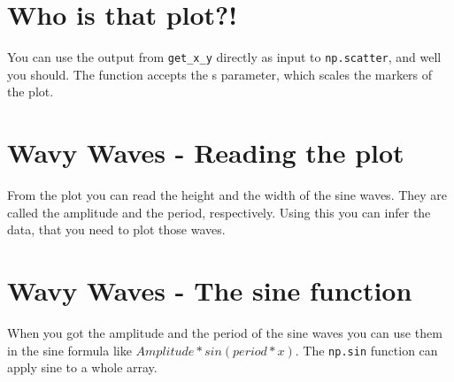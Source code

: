 \pagebreak

\section{Who is that plot?!}
You can use the output from \verb|get_x_y| directly as input to \verb|np.scatter|,
and well you should. The function accepts the s parameter, which scales the markers
of the plot.

\pagebreak

\section{Wavy Waves - Reading the plot}
From the plot you can read the height and the width of the sine waves. They are called
the amplitude and the period, respectively. Using this you can infer the data, that
you need to plot those waves.

\pagebreak

\section{Wavy Waves - The sine function}
When you got the amplitude and the period of the sine waves you can use them in the
sine formula like $Amplitude * sin(period * x)$. The \verb|np.sin| function can
apply sine to a whole array.



